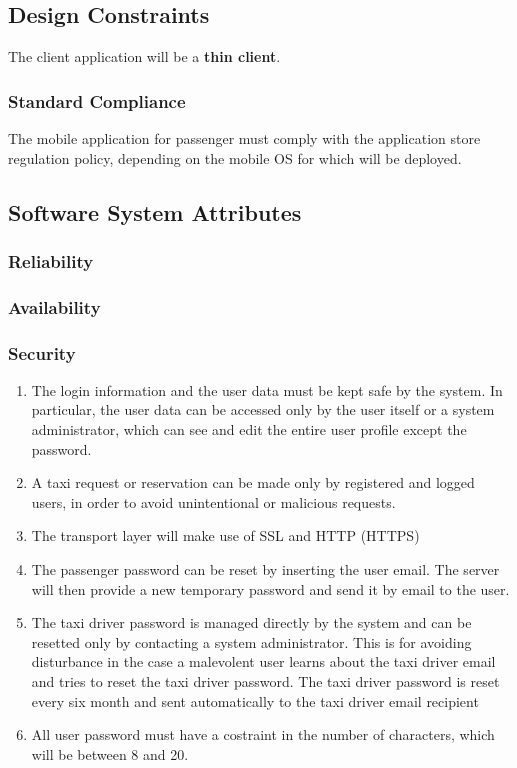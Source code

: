 \documentclass[11pt, a4paper,titlepage]{article}
\begin{document}
\subsection{Design Constraints}
 The client application will be a \textbf{thin client}.
\subsubsection{Standard Compliance}
	The mobile application for passenger must comply with the application store regulation policy, depending on the mobile OS for which will be deployed.
\subsection{Software System Attributes}
\subsubsection{Reliability}
\subsubsection{Availability}
\subsubsection{Security}
 \begin{enumerate}
 	\item The login information and the user data must be kept safe by the system. In particular, the user data can be accessed only by the user itself or a system administrator, which can see and edit the entire user profile except the password.
 	\item A taxi request or reservation can be made only by registered and logged users, in order to avoid unintentional or malicious requests.
 	\item The transport layer will make use of SSL and HTTP (HTTPS) 
 	\item The passenger password can be reset by inserting the user email. The server will then provide a new temporary password and send it by email to the user.
 	\item The taxi driver password is managed directly by the system and can be resetted only by contacting a system administrator. This is for avoiding disturbance in the case a malevolent user learns about the taxi driver email and tries to reset the taxi driver password. 
 	The taxi driver password is reset every six month and sent automatically to the taxi driver email recipient
 	\item All user password must have a costraint in the number of characters, which will be between 8 and 20.
 \end{enumerate}
\end{document}
